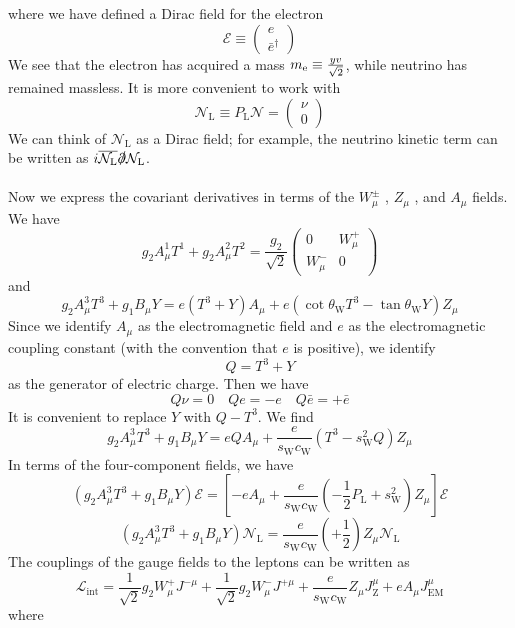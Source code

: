where we have defined a Dirac field for the electron
\[\mathcal{E} \equiv \begin{pmatrix}
e \\ \bar{e}^{\dagger}
\end{pmatrix} \]
We see that the electron has acquired a mass $m_{\rm e} \equiv \frac{yv}{\sqrt{2}}$, while neutrino has remained massless. It is more convenient to work with
\[\mathcal{N}_{\mathrm{L}} \equiv P_{\mathrm{L}} \mathcal{N} = \begin{pmatrix}
\nu \\ 0
\end{pmatrix}\]
We can think of $\mathcal{N}_{\mathrm{L}}$ as a Dirac field; for example, the neutrino kinetic term can be written as $i\overline{\mathcal{N}_{\mathrm{L}}} \slashed{\partial} \mathcal{N}_{\mathrm{L}}$.
\\ \\
Now we express the covariant derivatives in terms of the $W_{\mu}^{\pm}$ , $Z_{\mu}$ , and $A_{\mu}$ fields. We have
\[g_2 A^1_{\mu}T^1 + g_2 A^2_{\mu}T^2 = \frac{g_2}{\sqrt{2}} \begin{pmatrix}
0 & W_{\mu}^+ \\ W^{-}_{\mu} & 0
\end{pmatrix} \]
and
\[g_2A^3_{\mu}T^3 + g_1 B_{\mu} Y = e(T^3+Y)A_{\mu} + e(\cot\theta_{\mathrm{W}} T^3 - \tan\theta_{\mathrm{W}} Y)Z_{\mu}\]
Since we identify $A_{\mu}$ as the electromagnetic field and $e$ as the electromagnetic coupling constant (with the convention that $e$ is positive), we identify
\[Q = T^3 + Y\]
as the generator of electric charge. Then we have
\[Q\nu = 0 \quad Qe = -e \quad Q\bar{e} = +\bar{e}\]
It is convenient to replace $Y$ with $Q - T^3$. We find
\[g_2A^3_{\mu}T^3 + g_1 B_{\mu} Y = eQA_{\mu} + \frac{e}{s_{\mathrm{W}} c_{\mathrm{W}}}( T^3 -  s_{\mathrm{W}}^2Q)Z_{\mu}\]
In terms of the four-component fields, we have
\[(g_2A^3_{\mu}T^3 + g_1 B_{\mu} Y) \mathcal{E} = \left[-eA_{\mu} + \frac{e}{s_{\mathrm{W}} c_{\mathrm{W}}}( -\frac{1}{2}P_{\mathrm{L}} +  s_{\mathrm{W}}^2)Z_{\mu} \right] \mathcal{E}\]
\[(g_2A^3_{\mu}T^3 + g_1 B_{\mu} Y) \mathcal{N}_{\mathrm{L}} = \frac{e}{s_{\mathrm{W}} c_{\mathrm{W}}} (+\frac{1}{2}) Z_{\mu}\mathcal{N}_{\mathrm{L}} \]
The couplings of the gauge fields to the leptons can be written as
\[\mathcal{L}_{\mathrm{int}} = \frac{1}{\sqrt{2}}g_2W_{\mu}^{+} J^{-\mu} + \frac{1}{\sqrt{2}}g_2W_{\mu}^{-} J^{+\mu} +  \frac{e}{s_{\mathrm{W}} c_{\mathrm{W}}} Z_{\mu}J_{\mathrm{Z}}^{\mu} + eA_{\mu}J^{\mu}_{\mathrm{EM}}\] 
where
